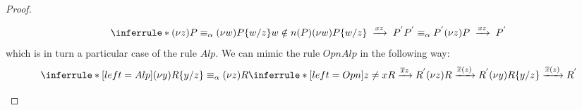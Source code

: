 \begin{theorem}
\begin{proof}
\begin{description}
	\[
	  \inferrule *{
	      (\nu z)P\equiv_{\alpha} (\nu w)P\{w/z\}
	    \\
	      w\notin n(P)
	    \\
	      (\nu w)P\{w/z\}\;
		\xrightarrow{xz}\;
		  P^{'}
	    \\
	      P^{'}\equiv_{\alpha} P^{'}
	  }{
	    (\nu z)P\; 
	      \xrightarrow{xz}\;
		P^{'}
	  }
	\]
	which is in turn a particular case of the rule $Alp$.
	We can mimic the rule $OpnAlp$ in the following way:
	    \[
	      \inferrule* [left=Alp]{
		  (\nu y)R\{y/z\}\equiv_{\alpha} (\nu z)R
		\\
		  \inferrule* [left=Opn]{
		      z\neq x
		    \\
		      R\xrightarrow{\overline{x}z}R^{'}
		  }{
		    (\nu z)R\xrightarrow{\overline{x}(z)}R^{'}
		  }
	      }{
		(\nu y)R\{y/z\}\xrightarrow{\overline{x}(z)}R^{'}
	      }
	    \]
    \end{description}
  \end{proof}
\end{theorem}
